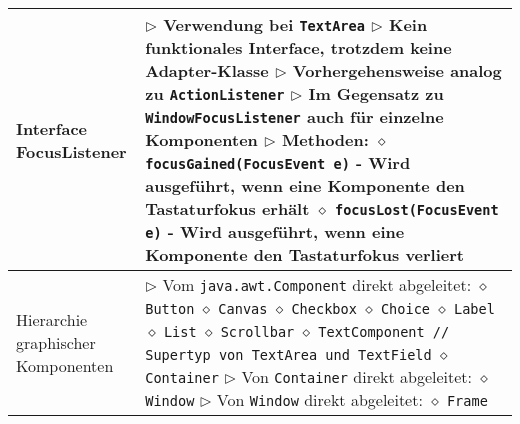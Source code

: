\begin{longtable}{ | p{} p{} | }
	\makecell[l]{Interface \\ FocusListener} & \makecell[l]{
	$\rhd$ Verwendung bei \texttt{TextArea} \\
	$\rhd$ Kein funktionales Interface, trotzdem keine Adapter-Klasse \\
	$\rhd$ Vorhergehensweise analog zu \texttt{ActionListener} \\
	$\rhd$ Im Gegensatz zu \texttt{WindowFocusListener} auch für einzelne Komponenten \\
	$\rhd$ Methoden: \\
	\hspace{0.4cm} $\diamond$ \texttt{focusGained(FocusEvent e)} \\ 
	\hspace{0.6cm} - Wird ausgeführt, wenn eine Komponente den Tastaturfokus erhält \\
	\hspace{0.4cm} $\diamond$ \texttt{focusLost(FocusEvent e)} \\
	\hspace{0.6cm} - Wird ausgeführt, wenn eine Komponente den Tastaturfokus verliert} \\ \hline

	\makecell[l]{Hierarchie graphischer \\ Komponenten} & \makecell[l]{
	$\rhd$ Vom \texttt{java.awt.Component} direkt abgeleitet: \\
	\hspace{0.4cm} $\diamond$ \texttt{Button} \\
	\hspace{0.4cm} $\diamond$ \texttt{Canvas} \\
	\hspace{0.4cm} $\diamond$ \texttt{Checkbox} \\
	\hspace{0.4cm} $\diamond$ \texttt{Choice} \\
	\hspace{0.4cm} $\diamond$ \texttt{Label} \\
	\hspace{0.4cm} $\diamond$ \texttt{List} \\
	\hspace{0.4cm} $\diamond$ \texttt{Scrollbar} \\
	\hspace{0.4cm} $\diamond$ \texttt{TextComponent // Supertyp von TextArea und TextField} \\
	\hspace{0.4cm} $\diamond$ \texttt{Container}
	$\rhd$ Von \texttt{Container} direkt abgeleitet: \\
	\hspace{0.4cm} $\diamond$ \texttt{Window} \\
	$\rhd$ Von \texttt{Window} direkt abgeleitet: \\
	\hspace{0.4cm} $\diamond$ \texttt{Frame} } \\ \hline



\end{longtable}
